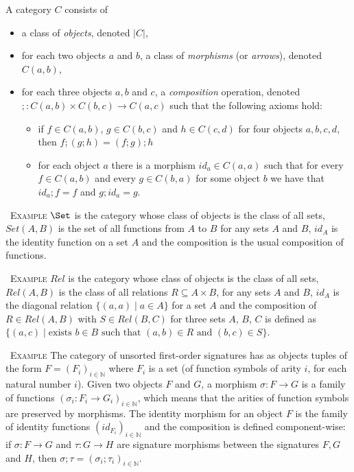 \documentclass[10pt, a4paper]{isov2}
\renewenvironment{example}[0]{\ \newline \textsc{Example}\quad }{}
\begin{document}
\begin{definition}
A category $C$ consists of 
 \begin{itemize} 
  \item a class of \emph{objects}, denoted $|C|$,

  \item for each two objects $a$ and $b$, a class of \emph{morphisms} (or \emph{arrows}), denoted $C(a,b)$,

  \item for each three objects $a, b$
and $c$,
a \emph{composition} operation, denoted
$; : C(a,b) \times C(b,c) \to C(a,c)$
such that the following axioms hold:
 \begin{itemize} 
  \item if $f \in C(a,b)$,
$g\in C(b,c)$
and $h \in C(c,d)$ for four objects $a,b,c,d$, then $f;(g;h) = (f;g);h$

  \item for each object $a$
there is a morphism $\mathit{id}_a\in C(a,a)$
such that for every $f \in C(a,b)$
and every $g \in C(b,a)$
for some object $b$ we have that $\mathit{id}_a;f = f$ and $g;\mathit{id}_a = g$.
 \end{itemize} 
 \end{itemize}  
\end{definition}

\begin{example}
$\Set$
is the category whose class of objects is the class of all sets,
$\mathit{Set}(A,B)$
is the set of all functions from $A$
to $B$
for any sets $A$
and $B$,
$\mathit{id}_A$
is the identity function on a set $A$
and the composition is the usual composition of functions.
\end{example}

\begin{example}
$\mathit{Rel}$
is the category whose class of objects is the class of all sets,
$\mathit{Rel}(A,B)$
is the class of all relations $R \subseteq A \times B$,
for any sets $A$
and $B$,
$\mathit{id}_A$
is the diagonal relation $\{(a,a) \mid a \in A\}$
for a set $A$
and the composition of $R\in Rel(A,B)$
with $S \in \mathit{Rel}(B,C)$
for three sets $A$, $B$, $C$
is defined as
$\{(a,c) \mid \text{exists } b \in B \text{ such that } (a,b)\in R
\text{ and } (b,c)\in S\}$.
\end{example}

\begin{example}
The category of unsorted first-order signatures has as objects tuples of
the form $F = (F_i)_{i\in \mathbb{N}}$
where $F_i$
is a set (of function symbols of arity $i$,
for each natural number $i$).
Given two objects $F$
and $G$,
a morphism $\sigma: F \to G$
is a family of functions $(\sigma_i:F_i\to G_i)_{i\in\mathbb{N}}$,
which means that the arities of function symbols are preserved by
morphisms.  The identity morphism for an object $F$
is the family of identity functions
$(\mathit{id}_{F_i})_{i\in\mathbb{N}}$
and the composition is defined component-wise: if $\sigma:F \to G$
and $\tau:G \to H$
are signature morphisms between the signatures $F, G$
and $H$, then $\sigma;\tau = (\sigma_i;\tau_i)_{i\in\mathbb{N}}$.
\end{example}
\end{document}
